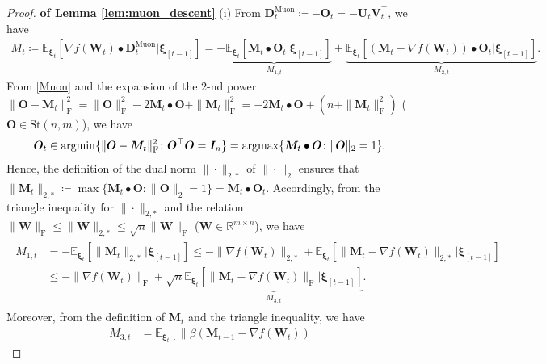 \documentclass[10pt,a4paper]{amsart}
\newcommand{\argmax}{\operatornamewithlimits{argmax}}
\newcommand{\argmin}{\operatornamewithlimits{argmin}}
\begin{document}
\begin{proof}
\textbf{of Lemma \ref{lem:muon_descent}} 
(i)
From $\bm{D}_t^{\mathrm{Muon}} \coloneqq - \bm{O}_t = - \bm{U}_t \bm{V}_t^\top$, we have 
\begin{align*}
M_t 
\coloneqq
\mathbb{E}_{\bm{\xi}_t} \left[ \nabla f (\bm{W}_t) \bullet \bm{D}_t^{\mathrm{Muon}} |\bm{\xi}_{[t-1]} \right]
= 
\underbrace{- \mathbb{E}_{\bm{\xi}_t} \left[ \bm{M}_t \bullet \bm{O}_t  \Big| \bm{\xi}_{[t-1]} \right]}_{M_{1,t}}
+ \underbrace{\mathbb{E}_{\bm{\xi}_t} \left[ (\bm{M}_t - \nabla f (\bm{W}_t)) \bullet \bm{O}_t  \Big| \bm{\xi}_{[t-1]} \right]}_{M_{2,t}}.
\end{align*}
From \eqref{Muon} and the expansion of the $2$-nd power $\| \bm{O} - \bm{M}_t \|_{\mathrm{F}}^2 = \|\bm{O} \|_{\mathrm{F}}^2 - 2 \bm{M}_t \bullet \bm{O} + \| \bm{M}_t \|_{\mathrm{F}}^2 = - 2 \bm{M}_t \bullet \bm{O} + (n + \| \bm{M}_t \|_{\mathrm{F}}^2)$ ($\bm{O} \in \mathrm{St}(n,m)$), we have 
\begin{align*}
\bm{O}_t  \in \argmin \{ \| \bm{O} - \bm{M}_t \|_{\mathrm{F}}^2 \colon \bm{O}^\top \bm{O} = \bm{I}_n  \}
= \argmax \{  \bm{M}_t \bullet \bm{O} \colon \| \bm{O} \|_2 = 1  \}. 
\end{align*} 
Hence, the definition of the dual norm $\| \cdot \|_{2,*}$ of $\| \cdot \|_{2}$ ensures that $\| \bm{M}_t \|_{2,*} \coloneqq \max \{ \bm{M}_t \bullet \bm{O} \colon \| \bm{O} \|_{2} = 1 \} = \bm{M}_t \bullet \bm{O}_t$. Accordingly, from the triangle inequality for $\| \cdot \|_{2,*}$ and the relation $\| \bm{W} \|_{\mathrm{F}} \leq \|\bm{W} \|_{2,*} \leq \sqrt{n} \|\bm{W}\|_{\mathrm{F}}$ ($\bm{W} \in \mathbb{R}^{m \times n}$), we have
\begin{align}\label{m_3_diff}
\begin{split}
M_{1,t} 
&= - \mathbb{E}_{\bm{\xi}_t} \left[ \| \bm{M}_t \|_{2,*} | \bm{\xi}_{[t-1]} \right]
\leq 
- \| \nabla f (\bm{W}_t) \|_{2,*}
+ \mathbb{E}_{\bm{\xi}_t} \left[ \| \bm{M}_t - \nabla f(\bm{W}_t) \|_{2,*} | \bm{\xi}_{[t-1]} \right]\\
&
\leq 
- \| \nabla f (\bm{W}_t) \|_{\mathrm{F}}
+ \sqrt{n} \underbrace{\mathbb{E}_{\bm{\xi}_t} \left[ \| \bm{M}_t - \nabla f(\bm{W}_t) \|_{\mathrm{F}} | \bm{\xi}_{[t-1]} \right]}_{M_{3,t}}.
\end{split}
\end{align}
Moreover, from the definition of $\bm{M}_t$ and the triangle inequality, we have 
\begin{align*}
M_{3,t} 
&= 
\mathbb{E}_{\bm{\xi}_t} \left[ \| \beta (\bm{M}_{t-1} - \nabla f(\bm{W}_t) )

\end{align*}
\end{proof}
\end{document}
